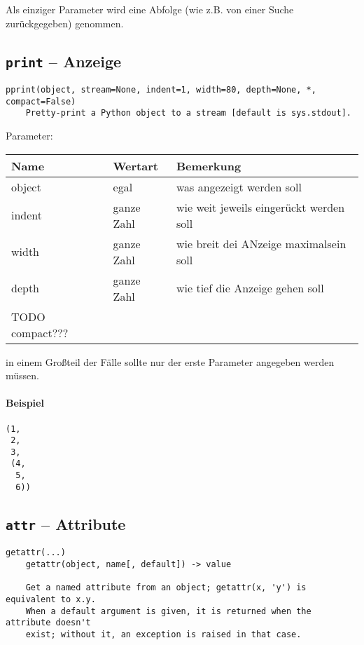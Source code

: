 Als einziger Parameter wird eine Abfolge (wie z.B. von einer Suche zurückgegeben) genommen.

\subsection{\texttt{print} -- Anzeige}
\label{subsec:command_list:command}

\begin{verbatim}
pprint(object, stream=None, indent=1, width=80, depth=None, *, compact=False)
    Pretty-print a Python object to a stream [default is sys.stdout].
\end{verbatim}

Parameter:

\begin{tabular}{|p{}|p{}|p{}|}
Name & Wertart & Bemerkung\\
\hline
object & egal & was angezeigt werden soll \\
indent & ganze Zahl & wie weit jeweils eingerückt werden soll \\
width & ganze Zahl & wie breit dei ANzeige maximalsein soll \\
depth & ganze Zahl & wie tief die Anzeige gehen soll \\
TODO compact???
\end{tabular}

in einem Gro\ss teil der Fälle sollte nur der erste Parameter angegeben werden müssen.

\paragraph{Beispiel}
\begin{verbatim}
(1,
 2,
 3,
 (4,
  5,
  6))
\end{verbatim}

\subsection{\texttt{attr} -- Attribute}
\label{subsec:command_list:attr}

\begin{verbatim}
getattr(...)
    getattr(object, name[, default]) -> value

    Get a named attribute from an object; getattr(x, 'y') is equivalent to x.y.
    When a default argument is given, it is returned when the attribute doesn't
    exist; without it, an exception is raised in that case.
\end{verbatim}

